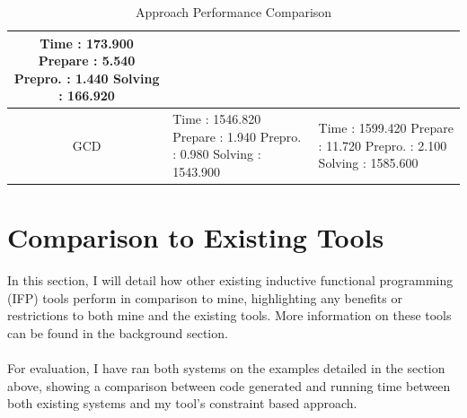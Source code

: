 \begin{table}[h!]
\begin{tabular}{|c|m{10em}|m{10em}|}
Time        : 173.900 \newline
  Prepare   : 5.540 \newline
  Prepro.   : 1.440 \newline
  Solving   : 166.920 \newline
\\
\hline
GCD 
& 
\mbox{}\newline 
Time        : 1546.820 \newline
  Prepare   : 1.940 \newline
  Prepro.   : 0.980 \newline
  Solving   : 1543.900 \newline
& 
\mbox{}\newline 
Time        : 1599.420 \newline
  Prepare   : 11.720 \newline
  Prepro.   : 2.100 \newline
  Solving   : 1585.600 \newline
\\
\hline
\end{tabular}
\caption{Approach Performance Comparison }
\label{table:3}
\end{table}

\pagebreak
\section{Comparison to Existing Tools}

In this section, I will detail how other existing inductive functional programming (IFP) tools perform in comparison to mine, highlighting any benefits or restrictions to both mine and the existing tools. More information on these tools can be found in the background section. \\ \\
For evaluation, I have ran both systems on the examples detailed in the section above, showing a comparison between code generated and running time between both existing systems and my tool's constraint based approach.

